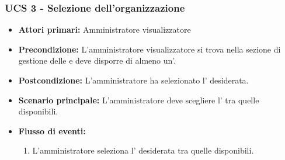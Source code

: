 \subsubsection{UCS 3 - Selezione dell'organizzazione}%
\begin{itemize}
    \item \textbf{Attori primari:} Amministratore visualizzatore
    \item \textbf{Precondizione:} L'amministratore visualizzatore si trova nella sezione di gestione delle  e deve disporre di almeno un'.
    \item \textbf{Postcondizione:} L'amministratore ha selezionato l' desiderata.
    \item \textbf{Scenario principale:} L'amministratore deve scegliere l' tra quelle disponibili.
    \item \textbf{Flusso di eventi:}
    \begin{enumerate}
        \item L'amministratore seleziona l' desiderata tra quelle disponibili.
    \end{enumerate}
\end{itemize}
